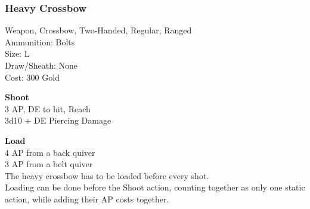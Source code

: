 \subsubsection{Heavy Crossbow}\label{weapon:heavyCrossbow}
Weapon, Crossbow, Two-Handed, Regular, Ranged\\
Ammunition: Bolts\\
Size: L\\
Draw/Sheath: None\\
Cost: 300 Gold

\textbf{Shoot} \\
3 AP, DE to hit,  Reach\\
3d10 + \texttimes DE Piercing Damage

\textbf{Load} \\
4 AP from a back quiver\\
3 AP from a belt quiver\\
The heavy crossbow has to be loaded before every shot.\\
Loading can be done before the Shoot action, counting together as only one static action, while adding their AP costs together.

